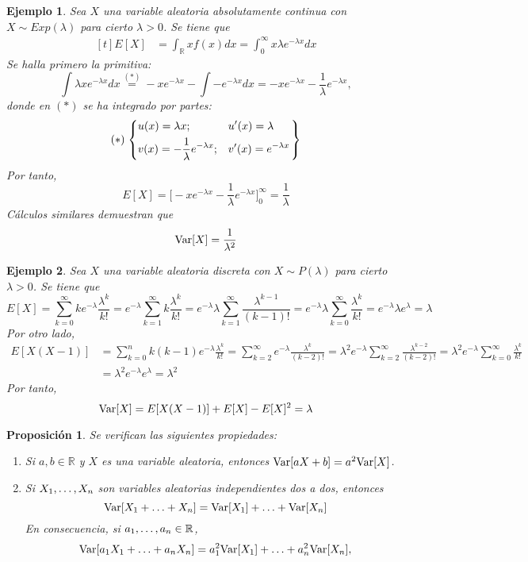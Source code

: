 \documentclass[11pt]{report}
\theoremstyle{mytheorem}
\newtheorem{proposition}{Proposición}
\theoremstyle{mydefinition}
\theoremstyle{myexample}
\newtheorem*{example}{Ejemplo}
\newenvironment{cproposition} %
  {\begin{mdframed}[
        linewidth=3pt,
        linecolor=c2,
        bottomline=false,
        topline=false,
        rightline=false,
        innerrightmargin=0pt,
        innertopmargin=0pt,
        innerbottommargin=0pt,
        innerleftmargin=1em,
        skipabove=\baselineskip]
    \begin{proposition}}
  {\end{proposition}\end{mdframed}}
\newcommand{\R}{\mathbb R}
\begin{document}
\begin{example}
Sea $X$ una variable aleatoria absolutamente continua con $X \sim Exp(\lambda)$ para cierto $\lambda >0$. Se tiene que
\[
\begin{aligned}[t]
E[X] &= \int_\R xf(x)dx = \int_0^{\infty}x\lambda e^{-\lambda x}dx
\end{aligned}
\]
Se halla primero la primitiva:
\[\int \lambda x e^{-\lambda x}dx \overset{(*)}{=} -xe^{-\lambda x}-\int -e^{-\lambda x}dx = -xe^{-\lambda x}-\frac{1}{\lambda}e^{-\lambda x},\]
donde en $(*)$ se ha integrado por partes:
\[(*) \begin{rcases}
    \begin{dcases}
        u(x) = \lambda x; & u'(x) = \lambda \\
        v(x) = -\frac{1}{\lambda} e^{-\lambda x}; & v'(x) = e^{-\lambda x}  
    \end{dcases}
\end{rcases}\]
Por tanto,
\[E[X] = \biggl[-xe^{-\lambda x}-\frac{1}{\lambda}e^{-\lambda x} \biggr]_0^{\infty} = \frac{1}{\lambda}\]
Cálculos similares demuestran que
\[\textup{Var}[X] = \frac{1}{\lambda^2}\]
\end{example}

\begin{example}
Sea $X$ una variable aleatoria discreta con $X \sim P(\lambda)$ para cierto $\lambda > 0$. Se tiene que
\[E[X] = \sum_{k=0}^\infty k e^{-\lambda} \frac{\lambda^k}{k!} = e^{-\lambda}\sum_{k=1}^\infty k \frac{\lambda^k}{k!} = e^{-\lambda}\lambda \sum_{k=1}^\infty \frac{\lambda^{k-1}}{(k-1)!} = e^{-\lambda}\lambda \sum_{k=0}^\infty \frac{\lambda^k}{k!} = e^{-\lambda}\lambda e^\lambda = \lambda\]
Por otro lado,
\[
\begin{aligned}
E[X(X-1)] &= \sum_{k=0}^n k(k-1)e^{-\lambda}\frac{\lambda^k}{k!} = \sum_{k=2}^\infty e^{-\lambda}\frac{\lambda^k}{(k-2)!} = \lambda^2 e^{-\lambda} \sum_{k=2}^\infty \frac{\lambda^{k-2}}{(k-2)!} = \lambda^2 e^{-\lambda} \sum_{k= 0}^\infty \frac{\lambda^k}{k!} \\
&= \lambda^2 e^{-\lambda}e^{\lambda} = \lambda^2
\end{aligned}
\]
Por tanto,
\[\textup{Var}[X] = E[X(X-1)]+E[X]-E[X]^2 = \lambda\]
\end{example}

\begin{cproposition}
Se verifican las siguientes propiedades:
\begin{enumerate}
    \item Si $a, b \in \R$ y $X$ es una variable aleatoria, entonces $\textup{Var}[aX+b] = a^2 \textup{Var}[X]$.
    \item Si $X_1,\mathellipsis,X_n$ son variables aleatorias independientes dos a dos, entonces
    \[\textup{Var}[X_1+\mathellipsis+X_n] = \textup{Var}[X_1]+\mathellipsis+\textup{Var}[X_n]\]
    En consecuencia, si $a_1,\mathellipsis,a_n \in \R$,
    \[\textup{Var}[a_1X_1+\mathellipsis+a_nX_n] = a_1^2\textup{Var}[X_1]+\mathellipsis+a_n^2\textup{Var}[X_n],\]
    \end{enumerate}
\end{cproposition}
\end{document}
